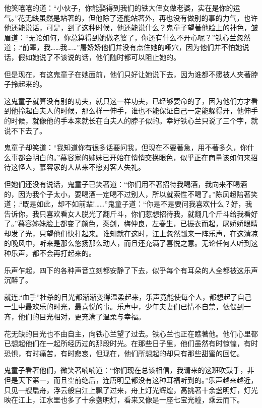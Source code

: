 \documentclass[12pt,oneside]{book}
\begin{document}
他笑嘻嘻的道：``小伙子，你能娶得到我们的铁大侄女做老婆，实在是你的运气。''花无缺虽然是站著的，但他除了还能站著外，再也没有做别的事的力气，也许他还能说话，可是，到了这种时候，他还能说什么？鬼童子望著他脸上的神色，皱眉道：``无论如何，你总算得到她做老婆了，你还有什么不开心呢？''铁心兰忽然道；.``前辈，我\ldots\ldots 我\ldots\ldots{}''屠娇娇他们并没有点住她的哑穴，因为他们并不怕她说话，假如她说了不该说的话，他们随时都可以阻止她的。

但是现在，有这鬼童子在她面前，他们只好让她说下去，因为谁都不愿被人夹著脖子拎起来的。

这鬼童子就算没有别的功夫，就只这一样功夫，已经够要命的了，因为他们方才看到他拎起白夫人的时候，那么样一伸手，谁也不能保证自己一定能躲得开，他伸手的时候，就像他的手本来就长在白夫人的脖子似的。幸好铁心兰只说了三个字，就说不下去了。

鬼童子却笑道：``我知道你有很多话要问我，但现在不要著急，用不著多久，你什么事都会明白的。''慕容家的姊妹已开始在悄悄交换眼色，似乎正在商量该如何来招待这怪人，慕容家的人从来不愿对客人失礼。

但她们还没有说话，鬼童子已笑著道：``你们用不著招待我喝酒，我向来不喝酒的，因为我个子太小，要喝酒一定喝不过别人，所以就索性不喝了。''陈凤超陪著笑道；.``既是如此，却不如前辈!\ldots\ldots{}''鬼童子道：``你是不是要问我喜欢什么？好，我告诉你，我只喜欢看女人脱光了翻斤斗，你们惹想招待我，就翻几个斤斗给我看好了。''慕容姊妹脸上都变了颜色，秦剑，梅仲良，左春生，已振衣而起，屠娇娇眼睛却发了光，只望他们快打起来。谁知就在这时，江上忽然瓢来一阵乐声，在这清凉的晚风中，听来是那么悠扬那么动人，而且还充满了喜悦之意。无论任何人听到这种乐声，都不会再打起来的。

乐声乍起，四下的各种声音立刻都安静了下去，似乎每个有耳朵的人全都被这乐声沉醉了。

就连.``血手''杜杀的目光都渐渐变得温柔起来，乐声竟能使每个人，都想起了自己一生中最欢乐的时光，最喜悦的事。乐声中，少年夫妻们已情不自禁，依偎到一齐，他们的目光相对，更充满了温柔与幸福。

花无缺的目光也不由自主，向铁心兰望了过去。铁心兰也正在瞧著他。他们心里都已想起他们在一起所经历过的那段时光。在那些日子里，他们虽然有时惊惶，有时恐惧，有时痛苦，有时悲哀，但现在，他们所想起的却只有那些甜蜜的回忆。

鬼童子看著他们，微笑著喃喃道：``你们现在总该相信，我请来的这班吹鼓手，非但是天下第一，而且空前绝后，连唐明皇都没有这种耳福听到的。''乐声越来越近，只见一艘扁舟，浮云般自江上飘了过来，舟上灯光辉煌，高挑著十余盏明灯，灯光映在江上，江水里也多了十余盏明灯，看来又像是一座七宝光幢，乘云而下。
\end{document}
